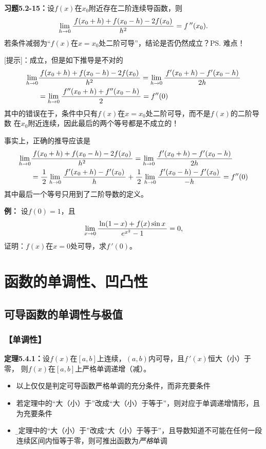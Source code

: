 {\b{\bf 习题5.2-15：}设$f(x)$在$x_0$附近存在二阶连续导函数，则
$$\lim\limits_{h\to 0}\displaystyle\frac{\,{f(x_0+h)+f(x_0-h)-2f(x_0)}\,}{\,{h^2}\,}=f\,''(x_0).$$
若条件减弱为“$f(x)$在$x=x_0$处二阶可导”，结论是否仍然成立？\ps{难点！}

[提示]：成立，但是如下推导是不对的
\begin{align}
	\lim\limits_{h\to 0}&\displaystyle\frac{\,{f(x_0+h)+f(x_0-h)-2f(x_0)}\,}{\,{h^2}\,}
	=\lim\limits_{h\to 0}\displaystyle\frac{\,{f'(x_0+h)-f'(x_0-h)}\,}{\,{2h}\,}\notag\\
	&=\lim\limits_{h\to 0}\displaystyle\frac{\,{f''(x_0+h)+f''(x_0-h)}\,}{\,{2}\,}
	=f''(0)\notag
\end{align}
其中的错误在于，条件中只有$f(x)$在$x=x_0$处二阶可导，而不是$f(x)$的二阶导数
在$x_0$附近连续，因此最后的两个等号都是不成立的！

事实上，正确的推导应该是
\begin{align}
	\lim\limits_{h\to 0}&\displaystyle\frac{\,{f(x_0+h)+f(x_0-h)-2f(x_0)}\,}{\,{h^2}\,}
	=\lim\limits_{h\to 0}\displaystyle\frac{\,{f'(x_0+h)-f'(x_0-h)}\,}{\,{2h}\,}\notag\\
	&=\displaystyle\frac{\,{1}\,}{\,{2}\,}\lim\limits_{h\to 0}\displaystyle\frac{\,{f'(x_0+h)-f'(x_0)}\,}{\,{h}\,}
	+\displaystyle\frac{\,{1}\,}{\,{2}\,}\lim\limits_{h\to 0}\displaystyle\frac{\,{f'(x_0-h)-f'(x_0)}\,}{\,{-h}\,}
	=f''(0)\notag
\end{align}
其中最后一个等号只用到了二阶导数的定义。}

{\bf 例：}
设$f(0)=1$，且
$$\lim\limits_{x\to{0}}\displaystyle\frac{\,{\ln(1-x)+f(x)\sin x}\,}{\,{e^{x^2}-1}\,}=0,$$
证明：$f(x)$在$x=0$处可导，求$f\,'(0)$。

\section{函数的单调性、凹凸性}

\subsection{可导函数的单调性与极值}

\subsubsection{【单调性】}

{\bf 定理5.4.1：}设$f(x)$在$[a,b]$上连续，$(a,b)$内可导，且$f\,'(x)$恒大（小）于零，
则$f(x)$在$[a,b]$上严格单调递增（减）。

\begin{itemize}
  \setlength{\itemindent}{1cm}
  \item 以上仅仅是判定可导函数严格单调的充分条件，而非充要条件 
  \item 若定理中的“大（小）于”改成“大（小）于等于”，则对应于单调递增情形，且为充要条件
  \item {\b 若定理中的“大（小）于”改成“大（小）于等于”，且导数知道不可能在任何一段
  连续区间内恒等于零，则可推出函数为{\it 严格}单调}
\end{itemize}

